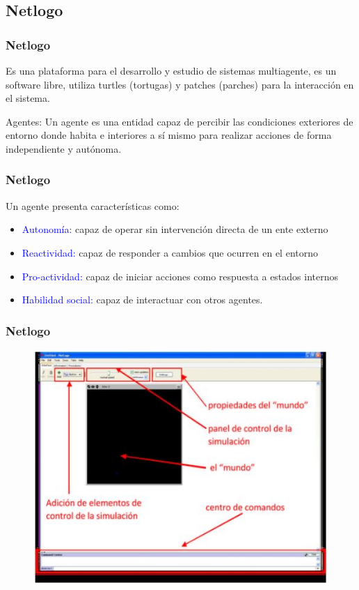 \documentclass{beamer}
\begin{document}
\subsection{Netlogo}
%
\begin{frame}
	\frametitle{Netlogo}
	Es una plataforma para el desarrollo y estudio de sistemas multiagente, es un software libre, utiliza turtles (tortugas)  y patches (parches) para la interacción en el sistema.\\ 
	
	\begin{block}{Agentes: }
		Un agente es una entidad capaz de percibir las condiciones exteriores de entorno donde habita e interiores a sí mismo para realizar acciones de forma independiente y autónoma.
	\end{block}
	
	
\end{frame}
%
%
\begin{frame}
	\frametitle{Netlogo}
	Un agente presenta características como:
	\begin{itemize}
		\item \textcolor{blue}{Autonomía:} capaz de operar sin intervención directa de un ente externo
		\item \textcolor{blue}{Reactividad:} capaz de responder a cambios que ocurren en el entorno
		\item \textcolor{blue}{Pro-actividad:} capaz de iniciar acciones como respuesta a estados internos
		\item \textcolor{blue}{Habilidad social:} capaz de interactuar con otros agentes.
	\end{itemize}
	
\end{frame}

\begin{frame}
	\frametitle{Netlogo}
	\begin{figure}
		\label{[fig02]}
		\includegraphics[scale=0.7]{partes_Netlogo.JPG}
	\end{figure}
\end{frame}
\end{document}
